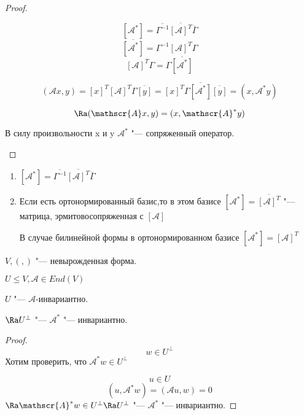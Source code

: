 \begin{proof}
\begin{enumerate}
    $$[\mathscr{A}^{*}] = \overline{\Gamma^{-1}}\overline{[\mathscr{A}]^{T}}\overline{\Gamma}$$
    $$\overline{[\mathscr{A}^*]} = \Gamma^{-1}[\mathscr{A}]^{T}\Gamma$$
    $$[\mathscr{A}]^{T} \Gamma = \Gamma \overline{[\mathscr{A}^*]}$$

    $$(\mathscr{A}x, y) = [x]^{T}[\mathscr{A}]^{T}\Gamma \overline{[y]} = [x]^{T}\Gamma \overline{[\mathscr{A}^*]}\overline{[y]} = (x, \mathscr{A}^{*}y)$$ 
    
    $$\Ra (\mathscr{A}x, y) = (x,  \mathscr{A}^*y)$$

    В силу произвольности x и y $\mathscr{A}^*$ "--- сопряженный оператор.  
    \end{enumerate}
\end{proof}

\begin{conseq}
    \begin{enumerate}
    \item $[\mathscr{A}^*] = \overline{\Gamma^{-1}}\overline{[\mathscr{A}]^{T}}\overline{\Gamma}$
    \item Если есть ортонормированный базис,то в этом базисе $[\mathscr{A}^*] = \overline{[\mathscr{A}]^T}$ "--- матрица, эрмитовосопряженная с $[\mathscr{A}]$

    В случае билинейной формы в ортонормированном базисе $[\mathscr{A}^*] = [\mathscr{A}]^{T}$
    \end{enumerate}
\end{conseq}

\begin{theorem}{}
$V, (,)$ "--- невырожденная форма. 

$U \le V, \mathscr{A} \in End(V)$

$U$ "--- $\mathscr{A}$-инвариантно. 

$\Ra U^{\bot}$ "--- $\mathscr{A}^{*}$ "--- инвариантно. 
\end{theorem}

\begin{proof}
$$w \in U^{\bot}$$ 
Хотим проверить, что $\mathscr{A}^{*}w \in U^{\bot}$

$$u \in U$$
$$(u, \mathscr{A}^*w) = (\mathscr{A}u, w) = 0$$
$\Ra \mathscr{A}^{*}w \in U^{\bot} \Ra U^{\bot}$ "--- $\mathscr{A}^{*}$ "--- инвариантно. 
\end{proof}

